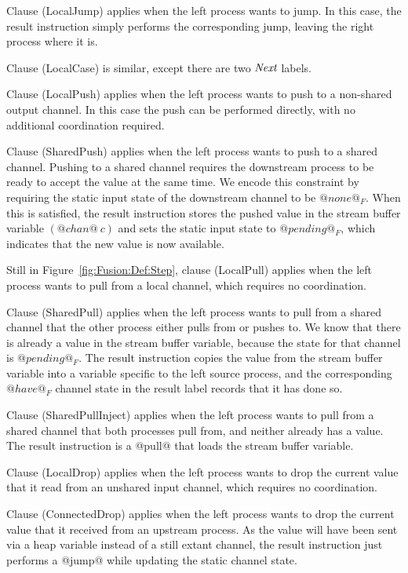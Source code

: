 Clause (LocalJump) applies when the left process wants to jump.
In this case, the result instruction simply performs the corresponding jump, leaving the right process where it is. 

Clause (LocalCase) is similar, except there are two $\textit{Next}$ labels.

Clause (LocalPush) applies when the left process wants to push to a non-shared output channel.
In this case the push can be performed directly, with no additional coordination required.

Clause (SharedPush) applies when the left process wants to push to a shared channel. Pushing to a shared channel requires the downstream process to be ready to accept the value at the same time. We encode this constraint by requiring the static input state of the downstream channel to be $@none@_F$. When this is satisfied, the result instruction stores the pushed value in the stream buffer variable $(@chan@~c)$ and sets the static input state to $@pending@_F$, which indicates that the new value is now available. 

Still in Figure~\ref{fig:Fusion:Def:Step}, clause (LocalPull) applies when the left process wants to pull from a local channel, which requires no coordination.

Clause (SharedPull) applies when the left process wants to pull from a shared channel that the other process either pulls from or pushes to. We know that there is already a value in the stream buffer variable, because the state for that channel is $@pending@_F$. The result instruction copies the value from the stream buffer variable into a variable specific to the left source process, and the corresponding $@have@_F$ channel state in the result label records that it has done so.

Clause (SharedPullInject) applies when the left process wants to pull from a shared channel that both processes pull from, and neither already has a value. The result instruction is a @pull@ that loads the stream buffer variable.

Clause (LocalDrop) applies when the left process wants to drop the current value that it read from an unshared input channel, which requires no coordination.

Clause (ConnectedDrop) applies when the left process wants to drop the current value that it received from an upstream process. As the value will have been sent via a heap variable instead of a still extant channel, the result instruction just performs a @jump@ while updating the static channel state.

